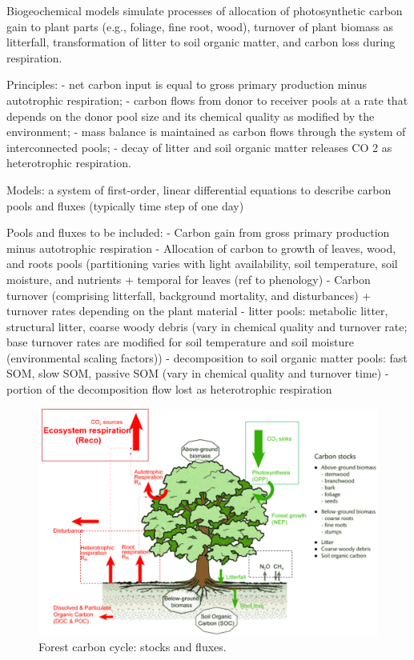\documentclass[12pt,oneside]{book}
\begin{document}
Biogeochemical models simulate processes of allocation of photosynthetic
carbon gain to plant parts (e.g., foliage, fine root, wood), turnover of
plant biomass as litterfall, transformation of litter to soil organic
matter, and carbon loss during respiration.

Principles: - net carbon input is equal to gross primary production
minus autotrophic respiration; - carbon flows from donor to receiver
pools at a rate that depends on the donor pool size and its chemical
quality as modified by the environment; - mass balance is maintained as
carbon flows through the system of interconnected pools; - decay of
litter and soil organic matter releases CO 2 as heterotrophic
respiration.

Models: a system of first-order, linear differential equations to
describe carbon pools and fluxes (typically time step of one day)

Pools and fluxes to be included: - Carbon gain from gross primary
production minus autotrophic respiration - Allocation of carbon to
growth of leaves, wood, and roots pools (partitioning varies with light
availability, soil temperature, soil moisture, and nutrients + temporal
for leaves (ref to phenology) - Carbon turnover (comprising litterfall,
background mortality, and disturbances) + turnover rates depending on
the plant material - litter pools: metabolic litter, structural litter,
coarse woody debris (vary in chemical quality and turnover rate; base
turnover rates are modified for soil temperature and soil moisture
(environmental scaling factors)) - decomposition to soil organic matter
pools: fast SOM, slow SOM, passive SOM (vary in chemical quality and
turnover time) - portion of the decomposition flow lost as heterotrophic
respiration

\begin{figure}

{\centering \includegraphics[width=0.8\linewidth]{figures/chap5/f52_stocks_fluxes} 

}

\caption{Forest carbon cycle: stocks and fluxes.}\label{fig:f52}
\end{figure}
\end{document}

